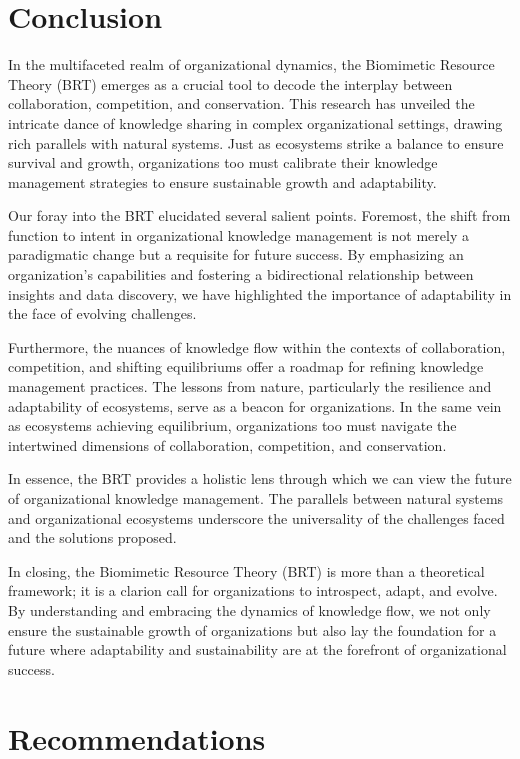\documentclass[sn-nature]{sn-jnl}%
\theoremstyle{thmstyleone}%
\theoremstyle{thmstyletwo}%
\theoremstyle{thmstylethree}%
\begin{document}
\section{Conclusion}

In the multifaceted realm of organizational dynamics, the Biomimetic Resource Theory (BRT) emerges as a crucial tool to decode the interplay between collaboration, competition, and conservation. This research has unveiled the intricate dance of knowledge sharing in complex organizational settings, drawing rich parallels with natural systems. Just as ecosystems strike a balance to ensure survival and growth, organizations too must calibrate their knowledge management strategies to ensure sustainable growth and adaptability.

Our foray into the BRT elucidated several salient points. Foremost, the shift from function to intent in organizational knowledge management is not merely a paradigmatic change but a requisite for future success. By emphasizing an organization's capabilities and fostering a bidirectional relationship between insights and data discovery, we have highlighted the importance of adaptability in the face of evolving challenges.

Furthermore, the nuances of knowledge flow within the contexts of collaboration, competition, and shifting equilibriums offer a roadmap for refining knowledge management practices. The lessons from nature, particularly the resilience and adaptability of ecosystems, serve as a beacon for organizations. In the same vein as ecosystems achieving equilibrium, organizations too must navigate the intertwined dimensions of collaboration, competition, and conservation.

In essence, the BRT provides a holistic lens through which we can view the future of organizational knowledge management. The parallels between natural systems and organizational ecosystems underscore the universality of the challenges faced and the solutions proposed.

In closing, the Biomimetic Resource Theory (BRT) is more than a theoretical framework; it is a clarion call for organizations to introspect, adapt, and evolve. By understanding and embracing the dynamics of knowledge flow, we not only ensure the sustainable growth of organizations but also lay the foundation for a future where adaptability and sustainability are at the forefront of organizational success.


\section{Recommendations}\label{sec9}
\end{document}
